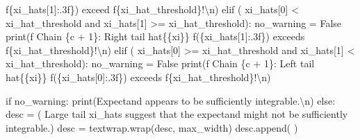 \documentclass[
  letterpaper,
  DIV=11,
  numbers=noendperiod]{scrartcl}
\newenvironment{Shaded}{\begin{snugshade}}{\end{snugshade}}
\newcommand{\BuiltInTok}[1]{\textcolor[rgb]{0.00,0.23,0.31}{#1}}
\newcommand{\CharTok}[1]{\textcolor[rgb]{0.13,0.47,0.30}{#1}}
\newcommand{\ControlFlowTok}[1]{\textcolor[rgb]{0.00,0.23,0.31}{#1}}
\newcommand{\DecValTok}[1]{\textcolor[rgb]{0.68,0.00,0.00}{#1}}
\newcommand{\KeywordTok}[1]{\textcolor[rgb]{0.00,0.23,0.31}{#1}}
\newcommand{\NormalTok}[1]{\textcolor[rgb]{0.00,0.23,0.31}{#1}}
\newcommand{\OperatorTok}[1]{\textcolor[rgb]{0.37,0.37,0.37}{#1}}
\newcommand{\SpecialCharTok}[1]{\textcolor[rgb]{0.37,0.37,0.37}{#1}}
\newcommand{\SpecialStringTok}[1]{\textcolor[rgb]{0.13,0.47,0.30}{#1}}
\newcommand{\StringTok}[1]{\textcolor[rgb]{0.13,0.47,0.30}{#1}}
\newcommand{\VariableTok}[1]{\textcolor[rgb]{0.07,0.07,0.07}{#1}}
\begin{document}
\begin{Shaded}
\begin{Highlighting}[]
            \SpecialStringTok{f\textquotesingle{}}\SpecialCharTok{\{}\NormalTok{xi\_hats[}\DecValTok{1}\NormalTok{]}\SpecialCharTok{:.3f\}}\SpecialStringTok{) exceed \textquotesingle{}}
            \SpecialStringTok{f\textquotesingle{}}\SpecialCharTok{\{}\NormalTok{xi\_hat\_threshold}\SpecialCharTok{\}}\SpecialStringTok{!}\CharTok{\textbackslash{}n}\SpecialStringTok{\textquotesingle{}}\NormalTok{)}
    \ControlFlowTok{elif}\NormalTok{ (    xi\_hats[}\DecValTok{0}\NormalTok{] }\OperatorTok{\textless{}}\NormalTok{ xi\_hat\_threshold }
          \KeywordTok{and}\NormalTok{ xi\_hats[}\DecValTok{1}\NormalTok{] }\OperatorTok{\textgreater{}=}\NormalTok{ xi\_hat\_threshold):}
\NormalTok{      no\_warning }\OperatorTok{=} \VariableTok{False}
      \BuiltInTok{print}\NormalTok{(}\SpecialStringTok{f\textquotesingle{}  Chain }\SpecialCharTok{\{}\NormalTok{c }\OperatorTok{+} \DecValTok{1}\SpecialCharTok{\}}\SpecialStringTok{: Right tail hat}\CharTok{\{\{}\SpecialStringTok{xi}\CharTok{\}\}}\SpecialStringTok{ \textquotesingle{}}
            \SpecialStringTok{f\textquotesingle{}(}\SpecialCharTok{\{}\NormalTok{xi\_hats[}\DecValTok{1}\NormalTok{]}\SpecialCharTok{:.3f\}}\SpecialStringTok{) exceeds \textquotesingle{}}
            \SpecialStringTok{f\textquotesingle{}}\SpecialCharTok{\{}\NormalTok{xi\_hat\_threshold}\SpecialCharTok{\}}\SpecialStringTok{!}\CharTok{\textbackslash{}n}\SpecialStringTok{\textquotesingle{}}\NormalTok{)}
    \ControlFlowTok{elif}\NormalTok{ (    xi\_hats[}\DecValTok{0}\NormalTok{] }\OperatorTok{\textgreater{}=}\NormalTok{ xi\_hat\_threshold }
          \KeywordTok{and}\NormalTok{ xi\_hats[}\DecValTok{1}\NormalTok{] }\OperatorTok{\textless{}}\NormalTok{ xi\_hat\_threshold):}
\NormalTok{      no\_warning }\OperatorTok{=} \VariableTok{False}
      \BuiltInTok{print}\NormalTok{(}\SpecialStringTok{f\textquotesingle{}  Chain }\SpecialCharTok{\{}\NormalTok{c }\OperatorTok{+} \DecValTok{1}\SpecialCharTok{\}}\SpecialStringTok{: Left tail hat}\CharTok{\{\{}\SpecialStringTok{xi}\CharTok{\}\}}\SpecialStringTok{ \textquotesingle{}}
            \SpecialStringTok{f\textquotesingle{}(}\SpecialCharTok{\{}\NormalTok{xi\_hats[}\DecValTok{0}\NormalTok{]}\SpecialCharTok{:.3f\}}\SpecialStringTok{) exceeds \textquotesingle{}}
            \SpecialStringTok{f\textquotesingle{}}\SpecialCharTok{\{}\NormalTok{xi\_hat\_threshold}\SpecialCharTok{\}}\SpecialStringTok{!}\CharTok{\textbackslash{}n}\SpecialStringTok{\textquotesingle{}}\NormalTok{)}
  
  \ControlFlowTok{if}\NormalTok{ no\_warning:}
    \BuiltInTok{print}\NormalTok{(}\StringTok{\textquotesingle{}Expectand appears to be sufficiently integrable.}\CharTok{\textbackslash{}n}\StringTok{\textquotesingle{}}\NormalTok{)}
  \ControlFlowTok{else}\NormalTok{:}
\NormalTok{    desc }\OperatorTok{=}\NormalTok{ (}\StringTok{\textquotesingle{}  Large tail xi\_hats suggest that the expectand might\textquotesingle{}}
            \StringTok{\textquotesingle{}not be sufficiently integrable.\textquotesingle{}}\NormalTok{)}
\NormalTok{    desc }\OperatorTok{=}\NormalTok{ textwrap.wrap(desc, max\_width)}
\NormalTok{    desc.append(}\StringTok{\textquotesingle{} \textquotesingle{}}\NormalTok{)}
\end{Highlighting}
\end{Shaded}
\end{document}
